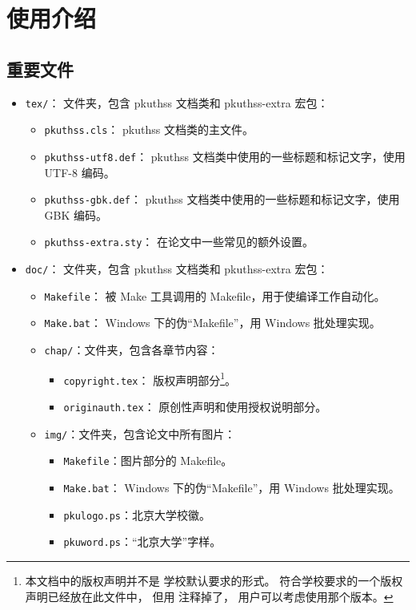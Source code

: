 
\chapter{使用介绍}
	\section{重要文件}

	\begin{itemize}
		\item \verb|tex/|：
			文件夹，包含 pkuthss 文档类和 pkuthss-extra 宏包：
		\begin{itemize}
			\item \verb|pkuthss.cls|：%
				pkuthss 文档类的主文件。
			\item \verb|pkuthss-utf8.def|：%
				pkuthss 文档类中使用的一些标题和标记文字，使用 UTF-8 编码。
			\item \verb|pkuthss-gbk.def|：%
				pkuthss 文档类中使用的一些标题和标记文字，使用 GBK 编码。
			\item \verb|pkuthss-extra.sty|：
				在论文中一些常见的额外设置。
		\end{itemize}
		
		\item \verb|doc/|：
			文件夹，包含 pkuthss 文档类和 pkuthss-extra 宏包：
		\begin{itemize}
			\item \verb|Makefile|：
				被 Make 工具调用的 Makefile，用于使编译工作自动化。
			\item \verb|Make.bat|：%
				Windows 下的伪“Makefile”，用 Windows 批处理实现。
			\item \verb|chap/|：文件夹，包含各章节内容：
			\begin{itemize}
				\item \verb|copyright.tex|：
					版权声明部分\footnote{%
						本文档中的版权声明并不是%
						学校默认要求的形式\cite{pku-copyright}。
						符合学校要求的一个版权声明已经放在此文件中，
						但用 \texttt{\string\iffalse{} ... \string\fi} %
						注释掉了，
						用户可以考虑使用那个版本。
					}。
				\item \verb|originauth.tex|：
					原创性声明和使用授权说明部分\cite{pku-originauth}。
			\end{itemize}
			\item \verb|img/|：文件夹，包含论文中所有图片：
			\begin{itemize}
				\item \verb|Makefile|：图片部分的 Makefile。
				\item \verb|Make.bat|：%
					Windows 下的伪“Makefile”，用 Windows 批处理实现。
				\item \verb|pkulogo.ps|：北京大学校徽。
				\item \verb|pkuword.ps|：“北京大学”字样。
			\end{itemize}
		\end{itemize}
	\end{itemize}

